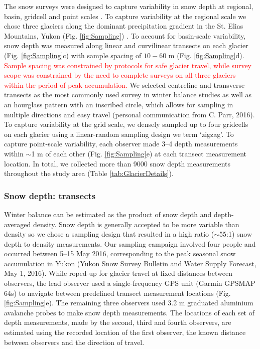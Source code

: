 \documentclass[twocolumn, letterpaper]{igs}
\begin{document}
The snow surveys were designed to capture variability in snow depth at regional, basin, gridcell and point scales \citep{Clark2011}. To capture variability at the regional scale we chose three glaciers along the dominant precipitation gradient in the St. Elias Mountains, Yukon (Fig. \ref{fig:Sampling}) \citep{Taylor1969}. To account for basin-scale variability, snow depth was measured along linear and curvilinear transects on each glacier (Fig. \ref{fig:Sampling}c) with sample spacing of $10-60$ m (Fig. \ref{fig:Sampling}d). \textcolor{red}{Sample spacing was constrained by protocols for safe glacier travel, while survey scope was constrained by the need to complete surveys on all three glaciers within the period of peak accumulation.} We selected centreline and transverse transects as the most commonly used survey in winter balance studies \citep[e.g.][]{Kaser2003, Machguth2006} as well as an hourglass pattern with an inscribed circle, which allows for sampling in multiple directions and easy travel (personal communication from C. Parr, 2016). To capture variability at the grid scale, we densely sampled up to four gridcells on each glacier using a linear-random sampling design we term `zigzag'. To capture point-scale variability, each observer made 3--4 depth measurements within $\sim$1 m of each other (Fig. \ref{fig:Sampling}e) at each transect measurement location. In total, we collected more than 9000 snow depth measurements throughout the study area (Table \ref {tab:GlacierDetails}). 

\subsubsection{Snow depth: transects}

Winter balance can be estimated as the product of snow depth and depth-averaged density. Snow depth is generally accepted to be more variable than density \citep{Elder1991, Clark2011, Lopez2013} so we chose a sampling design that resulted in a high ratio ($\sim$55:1) snow depth to density measurements. Our sampling campaign involved four people and occurred between 5--15 May 2016, corresponding to the peak seasonal snow accumulation in Yukon (Yukon Snow Survey Bulletin and Water Supply Forecast, May 1, 2016). While roped-up for glacier travel at fixed distances between observers, the lead observer used a single-frequency GPS unit (Garmin GPSMAP 64s) to navigate between predefined transect measurement locations (Fig. \ref{fig:Sampling}e). The remaining three observers used 3.2 m graduated aluminium avalanche probes to make snow depth measurements. The locations of each set of depth measurements, made by the second, third and fourth observers, are estimated using the recorded location of the first observer, the known distance between observers and the direction of travel. 
\end{document}
